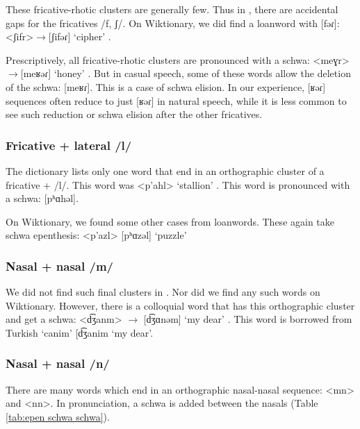 	These fricative-rhotic clusters are generally few. Thus  in \citeauthor{kouyoumdjian-1970-DictionaryArmenianEnglish}, there are accidental gaps for the fricatives /f, ʃ/. On Wiktionary, we did find a loanword with [fəɾ]: <ʃifr>$\rightarrow$[ʃifəɾ] `cipher' . 
	
	Prescriptively, all fricative-rhotic clusters are pronounced with a schwa: <meɣr>$\rightarrow$[meʁəɾ] `honey' . But in casual speech, some of these words allow the deletion of the schwa: [meʁɾ]. This is a case of schwa elision. In our experience, [ʁəɾ] sequences often reduce to just [ʁəɾ] in natural speech, while it is less common to see such reduction or schwa elision after the other fricatives. 
	\subsubsection{Fricative + lateral /l/}\label{section:syllable:Final2C:FlatRising:FricLateral}
	The \citeauthor{kouyoumdjian-1970-DictionaryArmenianEnglish} dictionary lists only one word that end in an orthographic cluster of a fricative + /l/. This word was <p'ahl>  `stallion' . This word is pronounced with a schwa: [pʰɑhəl]. 
	
	On Wiktionary, we found some other cases from loanwords. These again take schwa epenthesis: <p'azl>  [pʰɑzəl] `puzzle' 
	
	\subsubsection{Nasal + nasal /m/}\label{section:syllable:Final2C:FlatRising:NasalNasalM}
	We did not find such final clusters in \citeauthor{kouyoumdjian-1970-DictionaryArmenianEnglish}. Nor did we find any such words on Wiktionary. However,  there is a colloquial word  that has this orthographic cluster and get a schwa: <d͡ʒanm> $\rightarrow$ [d͡ʒɑnəm] `my dear' . This word is borrowed from Turkish `canim' [d͡ʒanim  `my dear'. 
	\subsubsection{Nasal +  nasal /n/}\label{section:syllable:Final2C:FlatRising:NasalNasalN}
	There are many words which end in an orthographic nasal-nasal sequence: <mn> and <nn>. In pronunciation, a schwa is added between the nasals (Table \ref{tab:epen schwa schwa}).  
	
